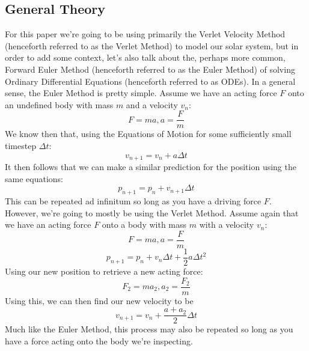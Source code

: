\documentclass{article}
\begin{document}
\subsection{General Theory}
For this paper we're going to be using primarily the Verlet Velocity Method (henceforth referred to as the Verlet Method) to model our solar system, but in order to add some context, let's also talk about the, perhaps more common, Forward Euler Method (henceforth referred to as the Euler Method) of solving Ordinary Differential Equations (henceforth referred to as ODEs). \newline
In a general sense, the Euler Method is pretty simple. Assume we have an acting force $F$ onto an undefined body with mass $m$ and a velocity $v_n$:
\begin{equation*}
    F = ma, a = \frac{F}{m}
\end{equation*}
\newline
We know then that, using the Equations of Motion for some sufficiently small timestep $\Delta t$:
\begin{equation*}
    v_{n+1} = v_{n} + a\Delta t
\end{equation*}
It then follows that we can make a similar prediction for the position using the same equations:
\begin{equation*}
    p_{n+1} = p_{n} + v_{n+1}\Delta t
\end{equation*}
This can be repeated ad infinitum so long as you have a driving force $F$.
However, we're going to mostly be using the Verlet Method.
\newline Assume again that we have an acting force $F$ onto a body with mass $m$ with a velocity $v_n$:
\begin{equation*}
    F = ma, a = \frac{F}{m}
\end{equation*}
\begin{equation*}
    p_{n+1} = p_{n} + v_{n}\Delta t + \frac{1}{2}a\Delta t^2
\end{equation*}
Using our new position to retrieve a new acting force:
\begin{equation*}
    F_2 = ma_2, a_2 = \frac{F_2}{m}
\end{equation*}
Using this, we can then find our new velocity to be
\begin{equation*}
    v_{n+1} = v_{n} + \frac{a+a_2}{2}\Delta t
\end{equation*}
Much like the Euler Method, this process may also be repeated so long as you have a force acting onto the body we're inspecting. \newline
\end{document}
